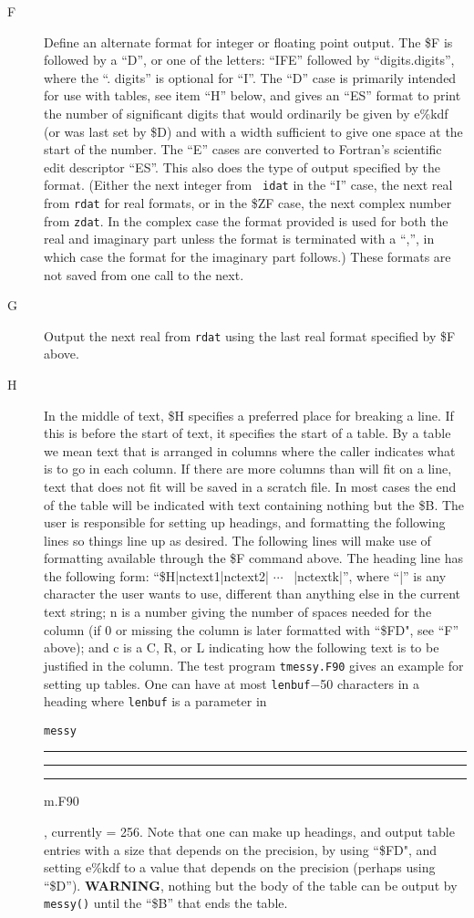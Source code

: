 \documentclass[12pt]{article}
\DeclareRobustCommand{\us}{\rule{.2pt}{0pt}\rule[-.8pt]{.4em}{.5pt}%
  \rule{.2pt}{0pt}}
\DeclareRobustCommand{\us}{\rule{.2pt}{0pt}\rule[-.8pt]{.4em}{.5pt}%
  \rule{.2pt}{0pt}}
\begin{document}
\begin{description}
\item[F] Define an alternate format for integer or floating point output.  The
  \$F is followed by a ``D'', or one of the letters: ``IFE'' followed by
  ``digits.digits'', where the ``. digits'' is optional for ``I''.  The ``D''
  case is primarily intended for use with tables, see item ``H'' below, and
  gives an ``ES'' format to print the number of significant digits that would
  ordinarily be given by e\%kdf (or was last set by \$D) and with a width
  sufficient to give one space at the start of the number.  The ``E'' cases are
  converted to Fortran's scientific edit descriptor ``ES''.  This also does the
  type of output specified by the format.  (Either the next integer from {\tt
    idat} in the ``I'' case, the next real from {\tt rdat} for real formats, or
  in the \$ZF case, the next complex number from {\tt zdat}.  In the complex
  case the format provided is used for both the real and imaginary part unless
  the format is terminated with a ``,'', in which case the format for the
  imaginary part follows.)  These formats are not saved from one call to the
  next.

\item[G] Output the next real from {\tt rdat} using the last real format
  specified by \$F above.

\item[H] In the middle of text, \$H specifies a preferred place for breaking a
  line.  If this is before the start of text, it specifies the start of a table.
  By a table we mean text that is arranged in columns where the caller indicates
  what is to go in each column.  If there are more columns than will fit on a
  line, text that does not fit will be saved in a scratch file.  In most cases
  the end of the table will be indicated with text containing nothing but the
  \$B.  The user is responsible for setting up headings, and formatting the
  following lines so things line up as desired.  The following lines will make
  use of formatting available through the \$F command above.  The heading line
  has the following form: ``\$H|nctext1|nctext2| $\cdots$ \ |nctextk|'', where
  ``|'' is any character the user wants to use, different than anything else in
  the current text string; n is a number giving the number of spaces needed for
  the column (if 0 or missing the column is later formatted with ``\$FD", see
  ``F'' above); and c is a C, R, or L indicating how the following text is to be
  justified in the column.  The test program {\tt tmessy.F90} gives an example
  for setting up tables.  One can have at most {\tt lenbuf}$-$50 characters in a
  heading where {\tt lenbuf} is a parameter in {\tt messy\us m.F90}, currently =
  256.  Note that one can make up headings, and output table entries with a size
  that depends on the precision, by using ``\$FD", and setting e\%kdf to a value
  that depends on the precision (perhaps using ``\$D'').  {\bf \large WARNING},
  nothing but the body of the table can be output by {\tt messy()} until the
  ``\$B'' that ends the table.


\end{description}
\end{document}
